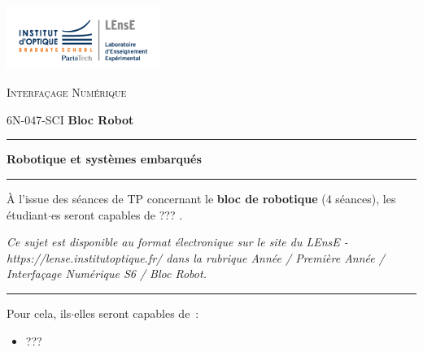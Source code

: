 \documentclass[a4paper,11pt,titlepage]{article} %
\begin{document}
\newpage
\strut %


\newpage
\pagestyle{empty}

\begin{minipage}[c]{.25\linewidth}
	\includegraphics[width=5cm]{images/Logo-LEnsE.png}
\end{minipage} \hfill
\begin{minipage}[c]{.4\linewidth}

\begin{center}
\vspace{0.3cm}
{\Large \textsc{Interfaçage Numérique}}

\medskip

6N-047-SCI \qquad \textbf{\Large Bloc Robot}

\end{center}
\end{minipage}\hfill

\vspace{0.5cm}

\noindent \rule{\linewidth}{1pt}

{\noindent\Large  \rule[-7pt]{0pt}{30pt} \textbf{Robotique et systèmes embarqués}}

\noindent \rule{\linewidth}{1pt}

\bigskip 


{\large À l'issue des séances de TP concernant le \textbf{bloc de robotique} (4 séances), les étudiant$\cdot$es seront capables de ??? .}

\medskip

\textit{Ce sujet est disponible au format électronique sur le site du LEnsE - https://lense.institutoptique.fr/ dans la rubrique Année / Première Année / Interfaçage Numérique S6 / Bloc Robot.}

\noindent \rule{\linewidth}{1pt}

\medskip

Pour cela, ils$\cdot$elles seront capables de~:

\begin{itemize}
	\item ???
\end{itemize}
\end{document}
